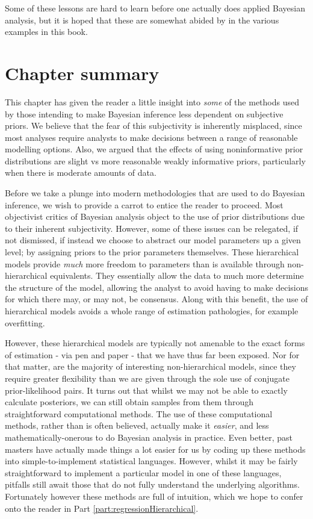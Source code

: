 \documentclass[11pt,fullpage]{book}
\begin{document}
Some of these lessons are hard to learn before one actually does applied Bayesian analysis, but it is hoped that these are somewhat abided by in the various examples in this book. 

\section{Chapter summary}
This chapter has given the reader a little insight into \textit{some} of the methods used by those intending to make Bayesian inference less dependent on subjective priors. We believe that the fear of this subjectivity is inherently misplaced, since most analyses require analysts to make decisions between a range of reasonable modelling options. Also, we argued that the effects of using noninformative prior distributions are slight vs more reasonable weakly informative priors, particularly when there is moderate amounts of data. 

Before we take a plunge into modern methodologies that are used to do Bayesian inference, we wish to provide a carrot to entice the reader to proceed. Most objectivist critics of Bayesian analysis object to the use of prior distributions due to their inherent subjectivity. However, some of these issues can be relegated, if not dismissed, if instead we choose to abstract our model parameters up a given level; by assigning priors to the prior parameters themselves. These hierarchical models provide \textit{much} more freedom to parameters than is available through non-hierarchical equivalents. They essentially allow the data to much more determine the structure of the model, allowing the analyst to avoid having to make decisions for which there may, or may not, be consensus. Along with this benefit, the use of hierarchical models avoids a whole range of estimation pathologies, for example overfitting.

However, these hierarchical models are typically not amenable to the exact forms of estimation - via pen and paper - that we have thus far been exposed. Nor for that matter, are the majority of interesting non-hierarchical models, since they require greater flexibility than we are given through the sole use of conjugate prior-likelihood pairs. It turns out that whilst we may not be able to exactly calculate posteriors, we can still obtain samples from them through straightforward computational methods. The use of these computational methods, rather than is often believed, actually make it \textit{easier}, and less mathematically-onerous to do Bayesian analysis in practice. Even better, past masters have actually made things a lot easier for us by coding up these methods into simple-to-implement statistical languages. However, whilst it may be fairly straightforward to implement a particular model in one of these languages, pitfalls still await those that do not fully understand the underlying algorithms. Fortunately however these methods are full of intuition, which we hope to confer onto the reader in Part \ref{part:regressionHierarchical}.
\end{document}
